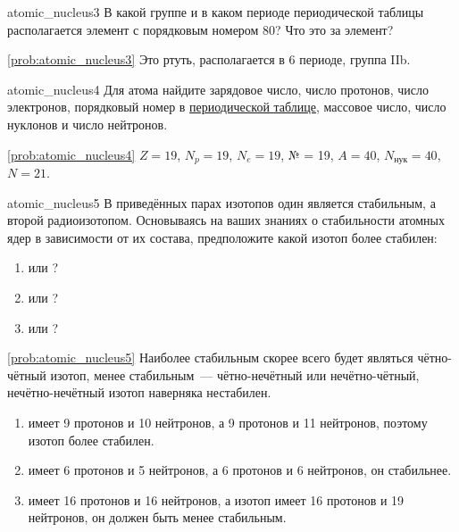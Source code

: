 \begin{problem}{}{atomic_nucleus3}
    В какой группе и в каком периоде периодической таблицы располагается элемент с порядковым номером 80? Что это за элемент?

    \begin{sol}{\ref{prob:atomic_nucleus3}}
        Это ртуть, располагается в 6 периоде, группа IIb.
    \end{sol}
\end{problem}

\begin{problem}{}{atomic_nucleus4}
    Для атома  найдите зарядовое число, число протонов, число электронов, порядковый номер в \hyperref[appendix:periodic_table]{периодической таблице}, массовое число, число нуклонов и число нейтронов.

    \begin{sol}{\ref{prob:atomic_nucleus4}}
        $Z = 19$, $N_p = 19$, $N_e = 19$, № = 19, $A = 40$, $N_{\text{нук}} = 40$, $N = 21$.
    \end{sol}
\end{problem}

\begin{problem}{}{atomic_nucleus5}
    В приведённых парах изотопов один является стабильным, а второй радиоизотопом. Основываясь на ваших знаниях о стабильности атомных ядер в зависимости от их состава, предположите какой изотоп более стабилен:
    \begin{enumerate}[label=\arabic*)]
        \item {} или ?
        \item {} или ?
        \item {} или ?
    \end{enumerate}
    \begin{sol}{\ref{prob:atomic_nucleus5}}
        Наиболее стабильным скорее всего будет являться чётно-чётный изотоп, менее стабильным~--- чётно-нечётный или нечётно-чётный, нечётно-нечётный изотоп наверняка нестабилен.
        \begin{enumerate}[label=\arabic*)]
            \item {} имеет 9 протонов и 10 нейтронов, а  9 протонов и 11 нейтронов, поэтому изотоп  более стабилен.
            \item {} имеет 6 протонов и 5 нейтронов, а  6 протонов и 6 нейтронов, он стабильнее.
            \item {} имеет 16 протонов и 16 нейтронов, а изотоп  имеет 16 протонов и 19 нейтронов, он должен быть менее стабильным.
        \end{enumerate}
    \end{sol}
\end{problem}

